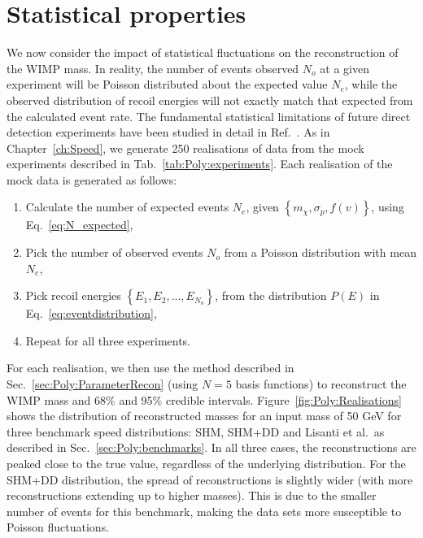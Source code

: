 \section{Statistical properties}
\label{sec:Poly:stats}


We now consider the impact of statistical fluctuations on the reconstruction of the WIMP mass. In reality, the number of events observed $N_o$ at a given experiment will be Poisson distributed about the expected value $N_e$, while the observed distribution of recoil energies will not exactly match that expected from the calculated event rate. The fundamental statistical limitations of future direct detection experiments have been studied in detail in Ref.~\cite{Strege:2012}. As in Chapter~\ref{ch:Speed}, we generate 250 realisations of data from the mock experiments described in Tab.~\ref{tab:Poly:experiments}. Each realisation of the mock data is generated as follows: 

\begin{enumerate}
\item Calculate the number of expected events $N_e$, given $\left\{m_\chi, \sigma_p, f(v)\right\}$, using Eq.~\ref{eq:N_expected},
\item Pick the number of observed events $N_o$ from a Poisson distribution with mean $N_e$,
\item Pick recoil energies $\left\{E_1, E_2, ..., E_{N_o}\right\}$, from the distribution $P(E)$ in Eq.~\ref{eq:eventdistribution},
\item Repeat for all three experiments.
\end{enumerate}

For each realisation, we then use the method described in Sec.~\ref{sec:Poly:ParameterRecon} (using $N = 5$ basis functions) to reconstruct the WIMP mass and 68\% and 95\% credible intervals. Figure~\ref{fig:Poly:Realisations} shows the distribution of reconstructed masses for an input mass of 50 GeV for three benchmark speed distributions: SHM, SHM+DD and Lisanti et al.\, as described in Sec.~\ref{sec:Poly:benchmarks}. In all three cases, the reconstructions are peaked close to the true value, regardless of the underlying distribution. For the SHM+DD distribution, the spread of reconstructions is slightly wider (with more reconstructions extending up to higher masses). This is due to the smaller number of events for this benchmark, making the data sets more susceptible to Poisson fluctuations.

